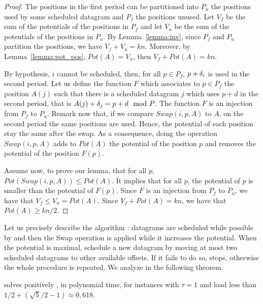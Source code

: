 \begin{proof}
The positions in the first period can be partitioned into $P_{u}$ the positions used by some scheduled datagram and $P_{f}$ the positions unused.
Let $V_f$ be the sum of the potentials of the positions in $P_f$ and let $V_u$ be the sum of the potentials of the positions in $P_u$. By Lemma~\ref{lemma:inv}, since $P_f$ and $P_u$ partition the positions, we have $V_f + V_u = kn$. Moreover, by Lemma~\ref{lemma:pot_pos}, $Pot(A) = V_u$, then $V_f + Pot(A) = kn$.

By hypothesis, $i$ cannot be scheduled, then, for all $p \in P_{f}$, $p+\delta_i$ is used in the second period. Let us define the function $F$ which associates to $p \in P_{f}$ the position $A(j)$ such that there is a scheduled datagram $j$ which uses $p+d$ in the second period, that is $A(j) + \delta_j = p + d \mod P$. The function $F$ is an injection from $P_{f}$ to $P_u$. Remark now that, if we compare $Swap(i,p,A)$ to $A$, on the second period the same positions are used. Hence, the potential of each position stay the same after the swap. As a consequence, doing the operation $Swap(i,p,A)$ adds to $Pot(A)$ the potential of the position $p$ and removes the potential of the position $F(p)$. 

Assume now, to prove our lemma, that for all $p$, $Pot(Swap(i,p,A)) \leq Pot(A)$. It implies that for all $p$, the potential of $p$ is smaller than the potential of $F(p)$. Since $F$ is an injection from $P_f$ to $P_u$, we have that $V_f \leq V_u = Pot(A)$. Since $V_f + Pot(A) = kn$, we have that $Pot(A) \geq kn/2$.
\end{proof}

Let us precisely describe the algorithm \swapandmove:  datagrams are scheduled while possible by \firstfit and then the Swap operation is applied while it increases the potential. When the potential is maximal, \swapandmove schedule a new datagram by moving at most two scheduled datagrams to other available offsets. If it fails to do so, \swapandmove stops, otherwise the whole procedure is repeated. We analyze \swapandmove in the following theorem.

\begin{theorem}
\swapandmove solves positively \pma, in polynomial time, for instances with $\tau =1$ and load less than $1/2 + (\sqrt{5}/2 -1) \approx 0,618$.
\end{theorem}

